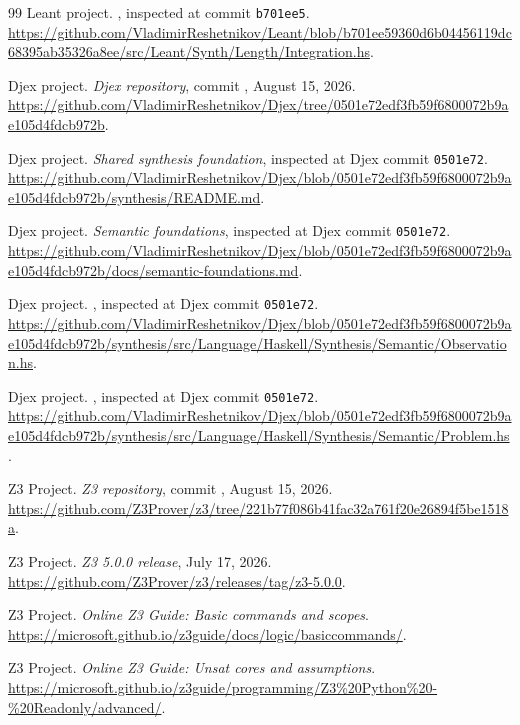 \documentclass[11pt,oneside]{report}
\newcommand{\code}[1]{\texttt{#1}}
\begin{document}
\begin{thebibliography}{99}
Leant project.
\newblock {}, inspected at commit \code{b701ee5}.
\newblock \url{https://github.com/VladimirReshetnikov/Leant/blob/b701ee59360d6b04456119dc68395ab35326a8ee/src/Leant/Synth/Length/Integration.hs}.

Djex project.
\newblock \emph{Djex repository}, commit
, August 15, 2026.
\newblock \url{https://github.com/VladimirReshetnikov/Djex/tree/0501e72edf3fb59f6800072b9ae105d4fdcb972b}.

Djex project.
\newblock \emph{Shared synthesis foundation}, inspected at Djex commit \code{0501e72}.
\newblock \url{https://github.com/VladimirReshetnikov/Djex/blob/0501e72edf3fb59f6800072b9ae105d4fdcb972b/synthesis/README.md}.

Djex project.
\newblock \emph{Semantic foundations}, inspected at Djex commit \code{0501e72}.
\newblock \url{https://github.com/VladimirReshetnikov/Djex/blob/0501e72edf3fb59f6800072b9ae105d4fdcb972b/docs/semantic-foundations.md}.

Djex project.
\newblock {}, inspected at Djex commit \code{0501e72}.
\newblock \url{https://github.com/VladimirReshetnikov/Djex/blob/0501e72edf3fb59f6800072b9ae105d4fdcb972b/synthesis/src/Language/Haskell/Synthesis/Semantic/Observation.hs}.

Djex project.
\newblock {}, inspected at Djex commit \code{0501e72}.
\newblock \url{https://github.com/VladimirReshetnikov/Djex/blob/0501e72edf3fb59f6800072b9ae105d4fdcb972b/synthesis/src/Language/Haskell/Synthesis/Semantic/Problem.hs}.

Z3 Project.
\newblock \emph{Z3 repository}, commit
, August 15, 2026.
\newblock \url{https://github.com/Z3Prover/z3/tree/221b77f086b41fac32a761f20e26894f5be1518a}.

Z3 Project.
\newblock \emph{Z3 5.0.0 release}, July 17, 2026.
\newblock \url{https://github.com/Z3Prover/z3/releases/tag/z3-5.0.0}.

Z3 Project.
\newblock \emph{Online Z3 Guide: Basic commands and scopes}.
\newblock \url{https://microsoft.github.io/z3guide/docs/logic/basiccommands/}.

Z3 Project.
\newblock \emph{Online Z3 Guide: Unsat cores and assumptions}.
\newblock \url{https://microsoft.github.io/z3guide/programming/Z3%20Python%20-%20Readonly/advanced/}.


\end{thebibliography}
\end{document}
